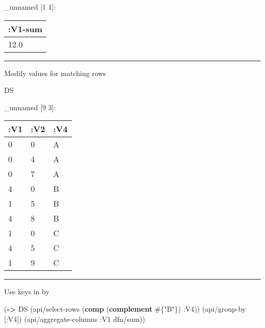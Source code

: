\documentclass[]{article}
\newenvironment{Shaded}{\begin{snugshade}}{\end{snugshade}}
\newcommand{\AttributeTok}[1]{\textcolor[rgb]{0.77,0.63,0.00}{#1}}
\newcommand{\BuiltInTok}[1]{#1}
\newcommand{\DecValTok}[1]{\textcolor[rgb]{0.00,0.00,0.81}{#1}}
\newcommand{\FunctionTok}[1]{\textcolor[rgb]{0.00,0.00,0.00}{#1}}
\newcommand{\KeywordTok}[1]{\textcolor[rgb]{0.13,0.29,0.53}{\textbf{#1}}}
\newcommand{\NormalTok}[1]{#1}
\newcommand{\StringTok}[1]{\textcolor[rgb]{0.31,0.60,0.02}{#1}}
\newcommand{\VariableTok}[1]{\textcolor[rgb]{0.00,0.00,0.00}{#1}}
\begin{document}
\_unnamed {[}1 1{]}:

\begin{longtable}[]{@{}l@{}}
\toprule
:V1-sum\tabularnewline
\midrule
\endhead
12.0\tabularnewline
\bottomrule
\end{longtable}

\begin{center}\rule{0.5\linewidth}{0.5pt}\end{center}

Modify values for matching rows

\begin{Shaded}
\end{Shaded}

\begin{Shaded}
\begin{Highlighting}[]
\NormalTok{DS}
\end{Highlighting}
\end{Shaded}

\_unnamed {[}9 3{]}:

\begin{longtable}[]{@{}lll@{}}
\toprule
:V1 & :V2 & :V4\tabularnewline
\midrule
\endhead
0 & 0 & A\tabularnewline
0 & 4 & A\tabularnewline
0 & 7 & A\tabularnewline
4 & 0 & B\tabularnewline
1 & 5 & B\tabularnewline
4 & 8 & B\tabularnewline
1 & 0 & C\tabularnewline
4 & 5 & C\tabularnewline
1 & 9 & C\tabularnewline
\bottomrule
\end{longtable}

\begin{center}\rule{0.5\linewidth}{0.5pt}\end{center}

Use keys in by

\begin{Shaded}
\begin{Highlighting}[]
\NormalTok{(}\KeywordTok{->}\NormalTok{ DS}
\NormalTok{    (api/select-rows (}\KeywordTok{comp}\NormalTok{ (}\KeywordTok{complement}\NormalTok{ #\{}\StringTok{"B"}\NormalTok{\}) }\AttributeTok{:V4}\NormalTok{))}
\NormalTok{    (api/group-by [}\AttributeTok{:V4}\NormalTok{])}
\NormalTok{    (api/aggregate-columns }\AttributeTok{:V1}\NormalTok{ dfn/sum))}
\end{Highlighting}
\end{Shaded}
\end{document}
